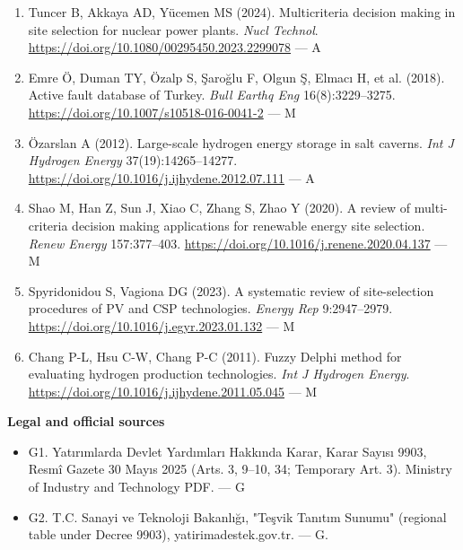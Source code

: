 \documentclass[11pt,a4paper]{article}
\begin{document}
\begin{enumerate}
  \item Tuncer B, Akkaya AD, Yücemen MS (2024). Multicriteria decision making in site selection for nuclear power plants. \textit{Nucl Technol}. \url{https://doi.org/10.1080/00295450.2023.2299078} --- A

  \item Emre Ö, Duman TY, Özalp S, Şaroğlu F, Olgun Ş, Elmacı H, et al. (2018). Active fault database of Turkey. \textit{Bull Earthq Eng} 16(8):3229--3275. \url{https://doi.org/10.1007/s10518-016-0041-2} --- M

  \item Özarslan A (2012). Large-scale hydrogen energy storage in salt caverns. \textit{Int J Hydrogen Energy} 37(19):14265--14277. \url{https://doi.org/10.1016/j.ijhydene.2012.07.111} --- A

  \item Shao M, Han Z, Sun J, Xiao C, Zhang S, Zhao Y (2020). A review of multi-criteria decision making applications for renewable energy site selection. \textit{Renew Energy} 157:377--403. \url{https://doi.org/10.1016/j.renene.2020.04.137} --- M

  \item Spyridonidou S, Vagiona DG (2023). A systematic review of site-selection procedures of PV and CSP technologies. \textit{Energy Rep} 9:2947--2979. \url{https://doi.org/10.1016/j.egyr.2023.01.132} --- M

  \item Chang P-L, Hsu C-W, Chang P-C (2011). Fuzzy Delphi method for evaluating hydrogen production technologies. \textit{Int J Hydrogen Energy}. \url{https://doi.org/10.1016/j.ijhydene.2011.05.045} --- M

\end{enumerate}

\textbf{Legal and official sources}

\begin{itemize}\setlength\itemsep{1pt}

  \item G1. Yatırımlarda Devlet Yardımları Hakkında Karar, Karar Sayısı 9903, Resmî Gazete 30 Mayıs 2025 (Arts. 3, 9--10, 34; Temporary Art. 3). Ministry of Industry and Technology PDF. --- G

  \item G2. T.C. Sanayi ve Teknoloji Bakanlığı, "Teşvik Tanıtım Sunumu" (regional table under Decree 9903), yatirimadestek.gov.tr. --- G.

\end{itemize}
\end{document}
